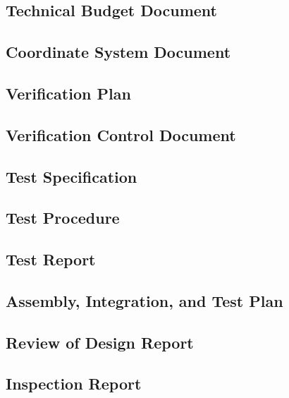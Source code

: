\subsection{Technical Budget Document}
\label{sec:Technical Budget Document}


\subsection{Coordinate System Document}
\label{sec:Coordinate System Document}


\subsection{Verification Plan}
\label{sec:Verification Plan}


\subsection{Verification Control Document}
\label{sec:Verification Control Document}


\subsection{Test Specification}
\label{sec:Test Specification}


\subsection{Test Procedure}
\label{sec:Test Procedure}


\subsection{Test Report}
\label{sec:Test Report}


\subsection{Assembly, Integration, and Test Plan}
\label{sec:Assembly, Integration, and Test Plan}


\subsection{Review of Design Report}
\label{sec:Review of Design Report}


\subsection{Inspection Report}
\label{sec:Inspection Report}


